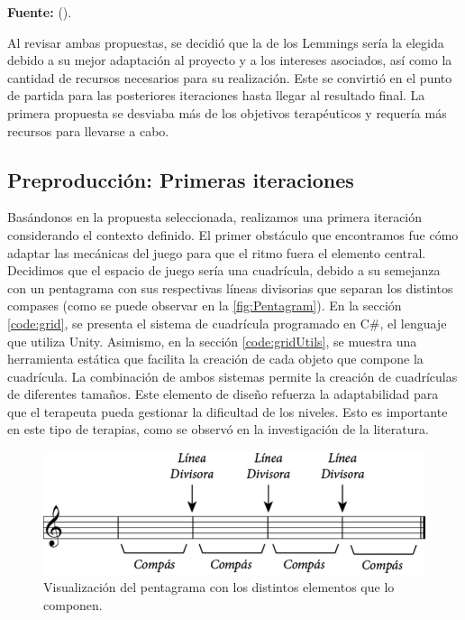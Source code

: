\begin{center}
	\textbf{Fuente:} \citeauthor{LEMMINGS:2024} (\citeyear{LEMMINGS:2024}).
\end{center}

Al revisar ambas propuestas, se decidió que la de los Lemmings sería la elegida debido a su mejor adaptación al proyecto y a los intereses asociados, así como la cantidad de recursos necesarios para su realización. Este se convirtió en el punto de partida para las posteriores iteraciones hasta llegar al resultado final. La primera propuesta se desviaba más de los objetivos terapéuticos y requería más recursos para llevarse a cabo.

\subsection{Preproducción: Primeras iteraciones}

Basándonos en la propuesta seleccionada, realizamos una primera iteración considerando el contexto definido. El primer obstáculo que encontramos fue cómo adaptar las mecánicas del juego para que el ritmo fuera el elemento central. Decidimos que el espacio de juego sería una cuadrícula, debido a su semejanza con un pentagrama con sus respectivas líneas divisorias que separan los distintos compases (como se puede observar en la \autoref{fig:Pentagram}). En la sección \ref{code:grid}, se presenta el sistema de cuadrícula programado en C\#, el lenguaje que utiliza Unity. Asimismo, en la sección \ref{code:gridUtils}, se muestra una herramienta estática que facilita la creación de cada objeto que compone la cuadrícula. La combinación de ambos sistemas permite la creación de cuadrículas de diferentes tamaños. Este elemento de diseño refuerza la adaptabilidad para que el terapeuta pueda gestionar la dificultad de los niveles. Esto es importante en este tipo de terapias, como se observó en la investigación de la literatura.

\begin{figure}[h!]
	\centering
	\includegraphics[width=0.8\linewidth]{Figuras/Desarrollo/Petagrama.png}
	\caption{Visualización del pentagrama con los distintos elementos que lo componen.}
	\label{fig:Pentagram}
	\vspace{-30pt}
\end{figure}

